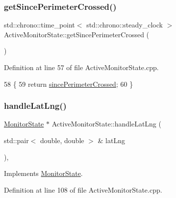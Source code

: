 \subsubsection{\texorpdfstring{get\+Since\+Perimeter\+Crossed()}{getSincePerimeterCrossed()}}
{\footnotesize\ttfamily std\+::chrono\+::time\+\_\+point$<$ std\+::chrono\+::steady\+\_\+clock $>$ Active\+Monitor\+State\+::get\+Since\+Perimeter\+Crossed (\begin{DoxyParamCaption}{ }\end{DoxyParamCaption})}



Definition at line 57 of file Active\+Monitor\+State.\+cpp.


\begin{DoxyCode}
58 \{
59     \textcolor{keywordflow}{return} \hyperlink{class_active_monitor_state_a4313399b0922fccd66ecea2fcf77c08f}{sincePerimeterCrossed};
60 \}
\end{DoxyCode}
\mbox{\label{class_active_monitor_state_a0eb7622ad3aa4d372d90589838cb50a9}} 
\subsubsection{\texorpdfstring{handle\+Lat\+Lng()}{handleLatLng()}}
{\footnotesize\ttfamily \hyperlink{class_monitor_state}{Monitor\+State} $\ast$ Active\+Monitor\+State\+::handle\+Lat\+Lng (\begin{DoxyParamCaption}\item[{std\+::pair$<$ double, double $>$ \&}]{lat\+Lng }\end{DoxyParamCaption})\hspace{0.3cm}{\ttfamily [override]}, {\ttfamily [virtual]}}



Implements \hyperlink{class_monitor_state_a8c8b871e3e8308e11f35905dd8741878}{Monitor\+State}.



Definition at line 108 of file Active\+Monitor\+State.\+cpp.


